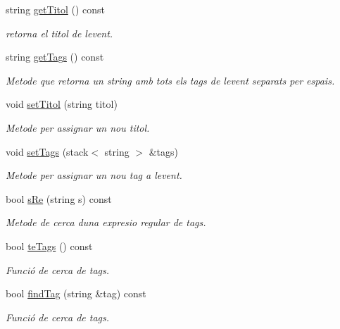\begin{DoxyCompactItemize}
\item 
string \hyperlink{class_event_a5a674a90725e7589757e98de7f109243}{get\+Titol} () const 
\begin{DoxyCompactList}\small\item\em retorna el titol de l\textquotesingle{}event. \end{DoxyCompactList}\item 
string \hyperlink{class_event_ad17c21131ed964fc3498689e9f7413b4}{get\+Tags} () const 
\begin{DoxyCompactList}\small\item\em Metode que retorna un string amb tots els tags de l\textquotesingle{}event separats per espais. \end{DoxyCompactList}\item 
void \hyperlink{class_event_a16ed22cc72c0249ade170184f280a1d8}{set\+Titol} (string titol)
\begin{DoxyCompactList}\small\item\em Metode per assignar un nou titol. \end{DoxyCompactList}\item 
void \hyperlink{class_event_ad8435cfd214339a65d51c08e548c8133}{set\+Tags} (stack$<$ string $>$ \&tags)
\begin{DoxyCompactList}\small\item\em Metode per assignar un nou tag a l\textquotesingle{}event. \end{DoxyCompactList}\item 
bool \hyperlink{class_event_a493830148bdab7c4ae1210d7cee91b81}{s\+Re} (string s) const 
\begin{DoxyCompactList}\small\item\em Metode de cerca d\textquotesingle{}una expresio regular de tags. \end{DoxyCompactList}\item 
bool \hyperlink{class_event_a575d9335b139c4172e83e96e3355b152}{te\+Tags} () const 
\begin{DoxyCompactList}\small\item\em Funció de cerca de tags. \end{DoxyCompactList}\item 
bool \hyperlink{class_event_a0435e64f8a58116953bbb7926d423334}{find\+Tag} (string \&tag) const 
\begin{DoxyCompactList}\small\item\em Funció de cerca de tags. \end{DoxyCompactList}\item 

\end{DoxyCompactItemize}
